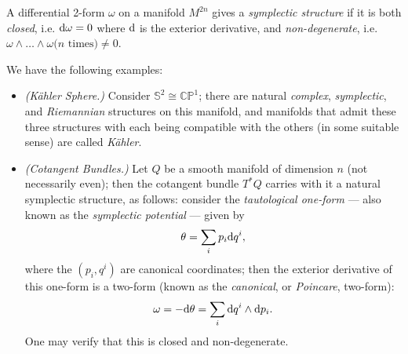 \begin{defn}
A differential 2-form $\omega$ on a manifold $M^{2n}$ gives a \emph{symplectic structure} if it is both \emph{closed}, i.e. $\mathrm{d}\omega = 0$ where $\mathrm{d}$ is the exterior derivative, and \emph{non-degenerate}, i.e. $\omega \wedge \ldots \wedge \omega \mbox{($n$ times)} \neq 0$.
\end{defn}

We have the following examples:
\begin{itemize}
\item \emph{(K\"{a}hler Sphere.)} Consider $\mathbb{S}^2 \cong \mathbb{CP}^1$; there are natural \emph{complex}, \emph{symplectic}, and \emph{Riemannian} structures on this manifold, and manifolds that admit these three structures with each being compatible with the others (in some suitable sense) are called \emph{K\"{a}hler}. 

\item \emph{(Cotangent Bundles.)} Let $Q$ be a smooth manifold of dimension $n$ (not necessarily even); then the cotangent bundle $T^*Q$ carries with it a natural symplectic structure, as follows: consider the \emph{tautological one-form} --- also known as the \emph{symplectic potential} --- given by
$$
\theta = \sum_i p_i \mathrm{d} q^i,
$$
where the $(p_i,q^i)$ are canonical coordinates; then the exterior derivative of this one-form is a two-form (known as the \emph{canonical}, or \emph{Poincare}, two-form):
$$
\omega = -\mathrm{d}\theta = \sum_i \mathrm{d} q^i \wedge \mathrm{d} p_i.
$$
One may verify that this is closed and non-degenerate.
\end{itemize}

